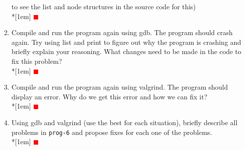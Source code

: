 \documentclass[12pt]{article}
\newcounter{problem}
\newcommand{\TODO}{\textcolor{red}{$\blacksquare$}}
\begin{document}
\begin{enumerate}
  to see the list and node structures in the source code for this)\\*[1em]
  \TODO
\item Compile and run the program again using gdb. The program should crash
  again. Try using list and print to figure out why the program is crashing and
  briefly explain your reasoning. What changes need to be made in the code to
  fix this problem?\\*[1em]
  \TODO
\item Compile and run the program again using valgrind. The program should
  display an error. Why do we get this error and how we can fix it?\\*[1em]
  \TODO
\item Using gdb and valgrind (use the best for each situation), briefly describe
  all problems in \texttt{prog-6} and propose fixes for each one of the
  problems.\\*[1em]
  \TODO
\end{enumerate}
\end{document}
